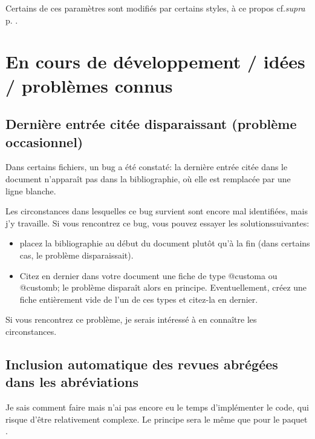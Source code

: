 \documentclass[a4paper]{ltxdockit}[2011/03/25]
\newcommand{\bbltxsl}{\sty{biblatex{\-}-swiss-{\-}legal}\xspace}
\newcommand{\lxrf}{\sty{lexref}\xspace}
\newcommand{\supra}{\emph{supra}\xspace}
\newcommand{\cf}{cf.\xspace}
\begin{document}
Certains de ces paramètres sont modifiés par certains styles, à ce propos \cf \supra p. \pageref{styles}.

\section{En cours de développement / idées / problèmes connus}

\subsection{Dernière entrée citée disparaissant (problème occasionnel)}

Dans certains fichiers, un bug a été constaté: la dernière entrée citée dans le document n'apparaît pas dans la bibliographie, où elle est remplacée par une ligne blanche.

Les circonstances dans lesquelles ce bug survient sont encore mal identifiées, mais j'y travaille. Si vous rencontrez ce bug, vous pouvez essayer les \og solutions\fg suivantes:
\begin{itemize}
\item placez la bibliographie au début du document plutôt qu'à la fin (dans certains cas, le problème disparaissait).
\item Citez en dernier dans votre document une fiche de type @customa ou @customb; le problème disparaît alors en principe. Eventuellement, créez une fiche entièrement vide de l'un de ces types et citez-la en dernier.
\end{itemize}

Si vous rencontrez ce problème, je serais intéressé à en connaître les circonstances.

\subsection{Inclusion automatique des revues abrégées dans les abréviations}\label{nomenclature}

Je sais comment faire mais n'ai pas encore eu le temps d'implémenter le code, qui risque d'être relativement complexe. Le principe sera le même que pour le paquet \lxrf.

\end{document}
